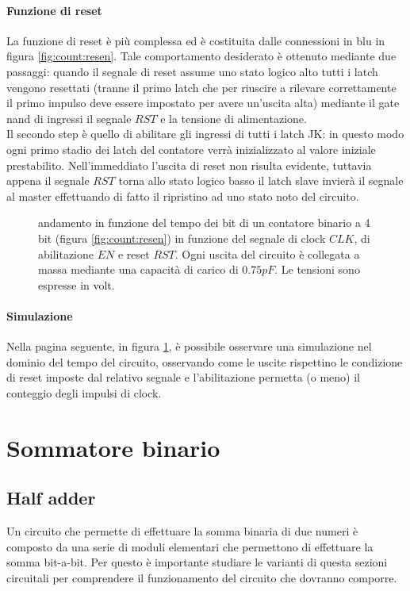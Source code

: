 	\paragraph{Funzione di reset} La funzione di reset è più complessa ed è costituita dalle connessioni in blu in figura \ref{fig:count:resen}. Tale comportamento desiderato è ottenuto mediante due passaggi: quando il segnale di reset assume uno stato logico alto tutti i latch vengono resettati (tranne il primo latch che per riuscire a rilevare correttamente il primo impulso deve essere impostato per avere un'uscita alta) mediante il gate nand di ingressi il segnale $RST$ e la tensione di alimentazione.\\
	Il secondo step è quello di abilitare gli ingressi di tutti i latch JK: in questo modo ogni primo stadio dei latch del contatore verrà inizializzato al valore iniziale prestabilito. Nell'immeddiato l'uscita di reset non risulta evidente, tuttavia appena il segnale $RST$ torna allo stato logico basso il latch slave invierà il segnale al master effettuando di fatto il ripristino ad uno stato noto del circuito.
	
	
	\begin{figure}[p]
		\centering
		
		\vspace{4mm}
		\caption{andamento in funzione del tempo dei bit di un contatore binario a 4 bit (figura \ref{fig:count:resen}) in funzione del segnale di clock $CLK$, di abilitazione $EN$ e reset $RST$. Ogni uscita del circuito è collegata a massa mediante una capacità di carico di $0.75pF$. Le tensioni sono espresse in volt.  }
		\label{fig:count:simresen}
	\end{figure}

	\paragraph{Simulazione} Nella pagina seguente, in figura \ref{fig:count:simresen}, è possibile osservare una simulazione nel dominio del tempo del circuito, osservando come le uscite rispettino le condizione di reset imposte dal relativo segnale e l'abilitazione permetta (o meno) il conteggio degli impulsi di clock.
	
\section{Sommatore binario}
\subsection*{Half adder}
	Un circuito che permette di effettuare la somma binaria di due numeri è composto da una serie di moduli elementari che permettono di effettuare la somma bit-a-bit. Per questo è importante studiare le varianti di questa sezioni circuitali per comprendere il funzionamento del circuito che dovranno comporre.
	
